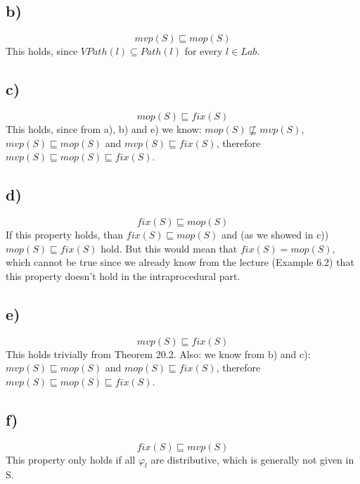 \documentclass[fleqn,12pt]{article}
\begin{document}
\subsection*{b)}
$$mvp(S) \sqsubseteq mop(S)$$
This holds, since $VPath(l) \subseteq Path(l)$ for every $l \in Lab$.
\subsection*{c)}
$$mop(S) \sqsubseteq fix(S)$$
This holds, since from a), b) and e) we know: $mop(S) \not\sqsubseteq mvp(S)$, $mvp(S) \sqsubseteq mop(S)$ and $mvp(S) \sqsubseteq fix(S)$, therefore $mvp(S) \sqsubseteq mop(S) \sqsubseteq fix(S)$.
\subsection*{d)}
$$fix(S) \sqsubseteq mop(S)$$
If this property holds, than $fix(S) \sqsubseteq mop(S)$ and (as we showed in c)) $mop(S) \sqsubseteq fix(S)$ hold. But this would mean that $fix(S) = mop(S)$, which cannot be true since we already know from the lecture (Example 6.2) that this property doesn't hold in the intraprocedural part.
\subsection*{e)}
$$mvp(S) \sqsubseteq fix(S)$$
This holds trivially from Theorem 20.2.
Also: we know from b) and c): $mvp(S) \sqsubseteq mop(S)$ and $mop(S) \sqsubseteq fix(S)$, therefore $mvp(S) \sqsubseteq mop(S) \sqsubseteq fix(S)$.
\subsection*{f)}
$$fix(S) \sqsubseteq mvp(S)$$
This property only holds if all $\varphi_l$ are distributive, which is generally not given in S.
\end{document}
